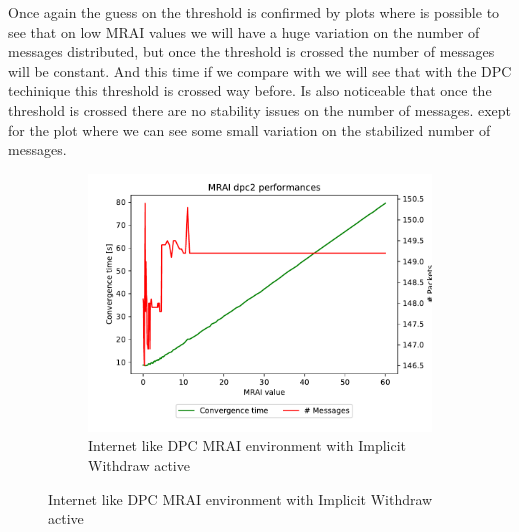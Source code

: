 \documentclass[10pt,conference,letterpaper]{IEEEtran}
\newcommand{\figwidth}{0.78}
\begin{document}
Once again the guess on the threshold is confirmed by 
plots where is possible to see that on low \ac{MRAI} values we will have a
huge variation on the number of messages distributed, but once the threshold
is crossed the number of messages will be constant.
And this time if we compare  with 
we will see that with the \ac{DPC} techinique this threshold is crossed way before.
Is also noticeable that once the threshold is crossed there are no stability issues
on the number of messages.
exept for the  plot where we can see some
small variation on the stabilized number of messages.

\begin{figure}[tb]
	\centering

	\begin{subfigure}{\columnwidth}
		\centering
		\includegraphics[width=\figwidth\columnwidth]{images/internet_like/graph-100-dpc/mrai_evolution}
		\caption{Internet like \ac{DPC} \ac{MRAI} environment with Implicit Withdraw active}
		\label{fig:dpc_mrai_evolution_IW}
		\qquad
	\end{subfigure}


\end{figure}
\end{document}

